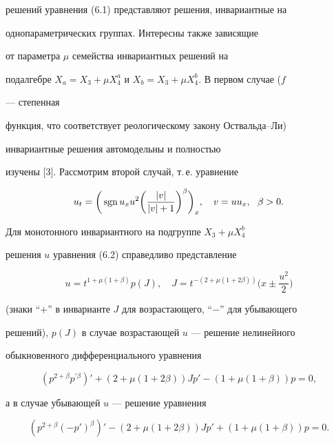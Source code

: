 решений уравнения (6.1) представляют решения, инвариантные на  


однопараметрических группах.  Интересны также зависящие  


от параметра $\mu$ семейства инвариантных решений на 


подалгебре $X_a=X_3+\mu X^a_4$ и $X_b=X_3+\mu X^b_4$. В первом случае ($f$ 


--- степенная 


функция, что соответствует реологическому закону Оствальда--Ли)  


инвариантные решения автомодельны и полностью  


изучены [3]. Рассмотрим второй случай, т.\,е. уравнение 


\begin{equation} 


u_t=\bigg(\sgn u_xu^2\bigg(\frac{|v|}{|v|+1}\bigg)^\beta\bigg)_x, 


\quad v=uu_x,\ \ \beta>0. 


\end{equation} 


Для монотонного инвариантного на подгруппе $X_3+\mu X^b_4$ 


решения $u$ уравнения (6.2) справедливо представление 


\begin{equation} 


u=t^{1+\mu(1+\beta)}p(J),\quad 


J=t^{-(2+\mu(1+2\beta))}\bigg(x\pm\frac{u^2}{2} \bigg) 


\end{equation} 


(знаки ``$+$'' в инварианте $J$ для возрастающего, ``$-$'' для убывающего  


решений), $p(J)$ в случае возрастающей $u$ --- решение нелинейного  


обыкновенного дифференциального уравнения 


\begin{equation} 


(p^{2+\beta}p^{\prime\beta})'+(2+\mu(1+2\beta))J p'- 


(1+\mu(1+\beta))p=0, 


\end{equation} 


а в случае убывающей $u$ --- решение уравнения 


\begin{equation} 


(p^{2+\beta}(-p')^\beta)'-(2+\mu(1+2\beta))J p' 


+(1+\mu(1+\beta))p=0. 


\end{equation} 


